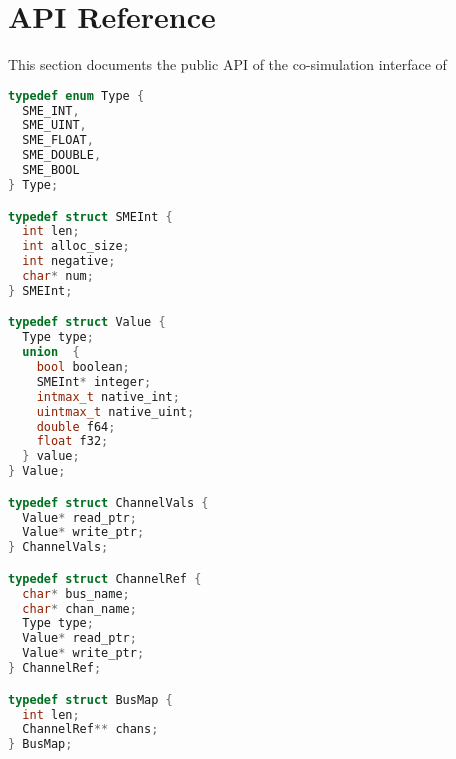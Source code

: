 \section{API Reference}
This section documents the public API of the co-simulation interface of \libsme{}

\begin{lstlisting}[language=c,multicols=2]
typedef enum Type {
  SME_INT,
  SME_UINT,
  SME_FLOAT,
  SME_DOUBLE,
  SME_BOOL
} Type;

typedef struct SMEInt {
  int len;
  int alloc_size;
  int negative;
  char* num;
} SMEInt;

typedef struct Value {
  Type type;
  union  {
    bool boolean;
    SMEInt* integer;
    intmax_t native_int;
    uintmax_t native_uint;
    double f64;
    float f32;
  } value;
} Value;

typedef struct ChannelVals {
  Value* read_ptr;
  Value* write_ptr;
} ChannelVals;

typedef struct ChannelRef {
  char* bus_name;
  char* chan_name;
  Type type;
  Value* read_ptr;
  Value* write_ptr;
} ChannelRef;

typedef struct BusMap {
  int len;
  ChannelRef** chans;
} BusMap;
\end{lstlisting}


